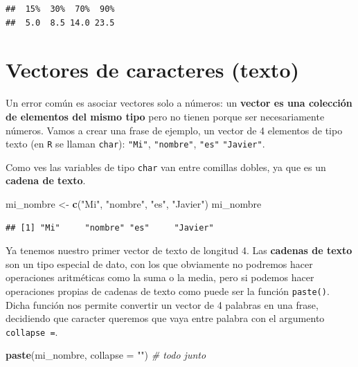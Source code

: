 \documentclass[11pt,]{book}
\newenvironment{Shaded}{\begin{snugshade}}{\end{snugshade}}
\newcommand{\CommentTok}[1]{\textcolor[rgb]{0.37,0.37,0.37}{\textit{#1}}}
\newcommand{\DataTypeTok}[1]{\textcolor[rgb]{0.27,0.27,0.27}{#1}}
\newcommand{\KeywordTok}[1]{\textcolor[rgb]{0.27,0.27,0.27}{\textbf{#1}}}
\newcommand{\NormalTok}[1]{#1}
\newcommand{\StringTok}[1]{\textcolor[rgb]{0.5,0.5,0.5}{#1}}
\begin{document}
\begin{verbatim}
##  15%  30%  70%  90% 
##  5.0  8.5 14.0 23.5
\end{verbatim}

\hypertarget{vectores-de-caracteres-texto}{%
\section{Vectores de caracteres (texto)}\label{vectores-de-caracteres-texto}}

Un error común es asociar vectores solo a números: un \textbf{vector es una colección de elementos del mismo tipo} pero no tienen porque ser necesariamente números. Vamos a crear una frase de ejemplo, un vector de 4 elementos de tipo texto (en \texttt{R} se llaman \texttt{char}): \texttt{"Mi"}, \texttt{"nombre"}, \texttt{"es"} \texttt{"Javier"}.

Como ves las variables de tipo \texttt{char} van entre comillas dobles, ya que es un \textbf{cadena de texto}.

\begin{Shaded}
\begin{Highlighting}[]
\NormalTok{mi_nombre <-}\StringTok{ }\KeywordTok{c}\NormalTok{(}\StringTok{"Mi"}\NormalTok{, }\StringTok{"nombre"}\NormalTok{, }\StringTok{"es"}\NormalTok{, }\StringTok{"Javier"}\NormalTok{)}
\NormalTok{mi_nombre}
\end{Highlighting}
\end{Shaded}

\begin{verbatim}
## [1] "Mi"     "nombre" "es"     "Javier"
\end{verbatim}

Ya tenemos nuestro primer vector de texto de longitud 4. Las \textbf{cadenas de texto} son un tipo especial de dato, con los que obviamente no podremos hacer operaciones aritméticas como la suma o la media, pero si podemos hacer operaciones propias de cadenas de texto como puede ser la función \texttt{paste()}. Dicha función nos permite convertir un vector de 4 palabras en una frase, decidiendo que caracter queremos que vaya entre palabra con el argumento \texttt{collapse\ =}.

\begin{Shaded}
\begin{Highlighting}[]
\KeywordTok{paste}\NormalTok{(mi_nombre, }\DataTypeTok{collapse =} \StringTok{""}\NormalTok{) }\CommentTok{# todo junto}
\end{Highlighting}
\end{Shaded}
\end{document}
